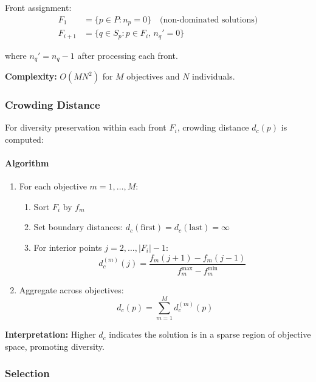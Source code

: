 Front assignment:
\begin{equation}
\begin{aligned}
F_1 &= \{p \in P : n_p = 0\} \quad \text{(non-dominated solutions)} \\
F_{i+1} &= \{q \in S_p : p \in F_i, \, n_q' = 0\}
\end{aligned}
\label{eq:front_assignment}
\end{equation}

where $n_q' = n_q - 1$ after processing each front.

\textbf{Complexity:} $O(MN^2)$ for $M$ objectives and $N$ individuals.

\subsubsection{Crowding Distance}

For diversity preservation within each front $F_i$, crowding distance $d_c(p)$ is computed:

\paragraph{Algorithm}
\begin{enumerate}
    \item For each objective $m = 1, \ldots, M$:
    \begin{enumerate}
        \item Sort $F_i$ by $f_m$
        \item Set boundary distances: $d_c(\text{first}) = d_c(\text{last}) = \infty$
        \item For interior points $j = 2, \ldots, |F_i| - 1$:
        \begin{equation}
        d_c^{(m)}(j) = \frac{f_m(j+1) - f_m(j-1)}{f_m^{\max} - f_m^{\min}}
        \label{eq:crowding_distance_obj}
        \end{equation}
    \end{enumerate}
    \item Aggregate across objectives:
    \begin{equation}
    d_c(p) = \sum_{m=1}^{M} d_c^{(m)}(p)
    \label{eq:crowding_distance_total}
    \end{equation}
\end{enumerate}

\textbf{Interpretation:} Higher $d_c$ indicates the solution is in a sparse region of objective space, promoting diversity.

\subsubsection{Selection}

